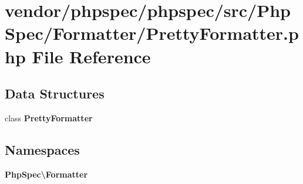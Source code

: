 \section{vendor/phpspec/phpspec/src/\+Php\+Spec/\+Formatter/\+Pretty\+Formatter.php File Reference}
\label{_pretty_formatter_8php}
\subsection*{Data Structures}
\begin{DoxyCompactItemize}
\item 
class {\bf Pretty\+Formatter}
\end{DoxyCompactItemize}
\subsection*{Namespaces}
\begin{DoxyCompactItemize}
\item 
 {\bf Php\+Spec\textbackslash{}\+Formatter}
\end{DoxyCompactItemize}
